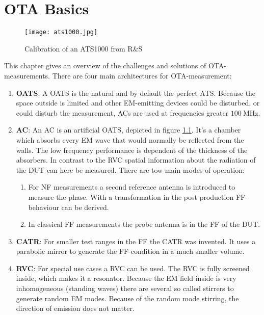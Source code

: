 \chapter{OTA Basics}


\begin{figure}[H]
\centering
\texttt{[image: ats1000.jpg]}
\caption{Calibration of an ATS1000 from R\&{}S}
\label{fig:ats}
\end{figure}

This chapter gives an overview of the challenges and solutions of \ac{OTA}-measurements. There are four main architectures for \ac{OTA}-measurement: \cite{ach}

\begin{enumerate}
\item \textbf{\acf{OATS}}: A \ac{OATS} is the natural and by default the perfect \ac{ATS}. Because the space outside is limited and other \ac{EM}-emitting devices could be disturbed, or could disturb the measurement, \acp{AC} are used at frequencies greater $\SI{100}{\mega\hertz}$.
\item \textbf{\acf{AC}}: An \ac{AC} is an artificial \ac{OATS}, depicted in figure \ref{fig:ats}. It's a  chamber which absorbs every \ac{EM} wave that would normally be reflected from the walls. The low frequency performance is dependent of the thickness of the absorbers. In contrast to the \ac{RVC} spatial information about the radiation of the \ac{DUT} can here be measured. There are tow main modes of operation:\begin{enumerate}
\item For \ac{NF} measurements a second reference antenna is introduced to measure the phase. With a transformation in the post production \ac{FF}-behaviour can be derived.
\item In classical \ac{FF} measurements the probe antenna is in the \ac{FF} of the \ac{DUT}.
\end{enumerate}
\item \textbf{\acf{CATR}}: For smaller test ranges in the \ac{FF} the \ac{CATR} was invented. It uses a parabolic mirror to generate the \ac{FF}-condition in a much smaller volume.
\item \textbf{\acf{RVC}}: For special use cases a \ac{RVC} can be used. The \ac{RVC} is fully screened inside, which makes it a resonator. Because the \ac{EM} field inside is very inhomogeneous (standing waves) there are several so called stirrers to generate random \ac{EM} modes. Because of the random mode stirring, the direction of emission does not matter.
\end{enumerate}


